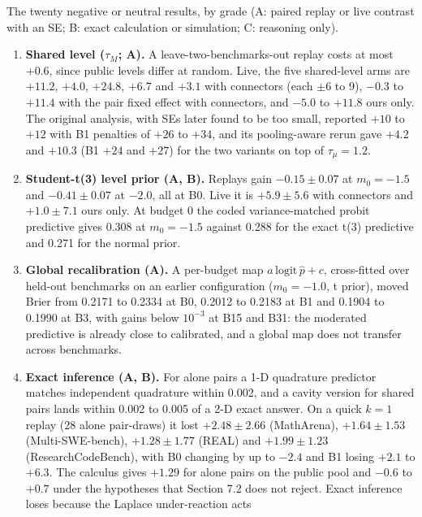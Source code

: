\documentclass[
]{article}
\providecommand{\tightlist}{%
  \setlength{\itemsep}{0pt}\setlength{\parskip}{0pt}}
\begin{document}
The twenty negative or neutral results, by grade (A: paired replay or
live contrast with an SE; B: exact calculation or simulation; C:
reasoning only).

\begin{enumerate}
\def\labelenumi{\arabic{enumi}.}
\tightlist
\item
  \textbf{Shared level (\(\tau_M\); A).} A leave-two-benchmarks-out
  replay costs at most \(+0.6\), since public levels differ at random.
  Live, the five shared-level arms are \(+11.2\), \(+4.0\), \(+24.8\),
  \(+6.7\) and \(+3.1\) with connectors (each \(\pm 6\) to 9), \(-0.3\)
  to \(+11.4\) with the pair fixed effect with connectors, and \(-5.0\)
  to \(+11.8\) ours only. The original analysis, with SEs later found to
  be too small, reported \(+10\) to \(+12\) with B1 penalties of \(+26\)
  to \(+34\), and its pooling-aware rerun gave \(+4.2\) and \(+10.3\)
  (B1 \(+24\) and \(+27\)) for the two variants on top of
  \(\tau_\mu = 1.2\).
\item
  \textbf{Student-t(3) level prior (A, B).} Replays gain
  \(-0.15 \pm 0.07\) at \(m_0 = -1.5\) and \(-0.41 \pm 0.07\) at
  \(-2.0\), all at B0. Live it is \(+5.9 \pm 5.6\) with connectors and
  \(+1.0 \pm 7.1\) ours only. At budget 0 the coded variance-matched
  probit predictive gives 0.308 at \(m_0 = -1.5\) against 0.288 for the
  exact t(3) predictive and 0.271 for the normal prior.
\item
  \textbf{Global recalibration (A).} A per-budget map
  \(a\,\mathrm{logit}\,\hat p + c\), cross-fitted over held-out
  benchmarks on an earlier configuration (\(m_0 = -1.0\), t prior),
  moved Brier from 0.2171 to 0.2334 at B0, 0.2012 to 0.2183 at B1 and
  0.1904 to 0.1990 at B3, with gains below \(10^{-3}\) at B15 and B31:
  the moderated predictive is already close to calibrated, and a global
  map does not transfer across benchmarks.
\item
  \textbf{Exact inference (A, B).} For alone pairs a 1-D quadrature
  predictor matches independent quadrature within 0.002, and a cavity
  version for shared pairs lands within 0.002 to 0.005 of a 2-D exact
  answer. On a quick \(k = 1\) replay (28 alone pair-draws) it lost
  \(+2.48 \pm 2.66\) (MathArena), \(+1.64 \pm 1.53\) (Multi-SWE-bench),
  \(+1.28 \pm 1.77\) (REAL) and \(+1.99 \pm 1.23\) (ResearchCodeBench),
  with B0 changing by up to \(-2.4\) and B1 losing \(+2.1\) to \(+6.3\).
  The calculus gives \(+1.29\) for alone pairs on the public pool and
  \(-0.6\) to \(+0.7\) under the hypotheses that Section 7.2 does not
  reject. Exact inference loses because the Laplace under-reaction acts

\end{enumerate}
\end{document}
